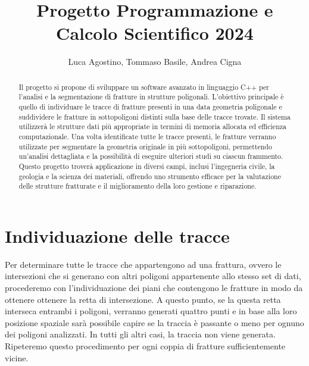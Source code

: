 \documentclass[a4paper]{article}
\title{Progetto Programmazione e Calcolo Scientifico 2024}
\author{Luca Agostino, Tommaso Basile, Andrea Cigna}
\begin{document}
\maketitle
\begin{abstract}
Il progetto si propone di sviluppare un software avanzato in linguaggio C++ per l'analisi e la segmentazione di fratture in strutture poligonali. L'obiettivo principale è quello di individuare le tracce di fratture presenti in una data geometria poligonale e suddividere le fratture in sottopoligoni distinti sulla base delle tracce trovate. Il sistema utilizzerà le strutture dati più appropriate in termini di memoria allocata ed efficienza computazionale. Una volta identificate tutte le tracce presenti, le fratture verranno utilizzate per segmentare la geometria originale in più sottopoligoni, permettendo un'analisi dettagliata e la possibilità di eseguire ulteriori studi su ciascun frammento. Questo progetto troverà applicazione in diversi campi, inclusi l'ingegneria civile, la geologia e la scienza dei materiali, offrendo uno strumento efficace per la valutazione delle strutture fratturate e il miglioramento della loro gestione e riparazione.
\end{abstract}

\tableofcontents

\section{Individuazione delle tracce}
Per determinare tutte le tracce che appartengono ad una frattura, ovvero le intersezioni che si generano con altri poligoni appartenente allo stesso set di dati, procederemo con l'individuazione dei piani che contengono le fratture in modo da ottenere ottenere la retta di intersezione. A questo punto, se la questa retta interseca entrambi i poligoni, verranno generati quattro punti e in base alla loro posizione spaziale sarà possibile capire se la traccia è passante o meno per ognuno dei poligoni analizzati. In tutti gli altri casi, la traccia non viene generata. Ripeteremo questo procedimento per ogni coppia di fratture sufficientemente vicine.
\end{document}
